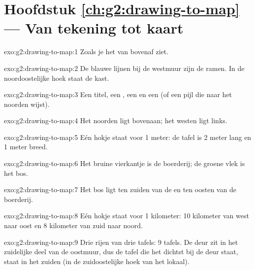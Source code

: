 \section*{Hoofdstuk \ref{ch:g2:drawing-to-map} --- Van tekening tot kaart}

\begin{solution}{exo:g2:drawing-to-map:1}
Zoals je het van bovenaf ziet.
\end{solution}

\begin{solution}{exo:g2:drawing-to-map:2}
De blauwe lijnen bij de westmuur zijn de ramen. In de noordoostelijke hoek
staat de kast.
\end{solution}

\begin{solution}{exo:g2:drawing-to-map:3}
Een titel, een , een  en een  (of een pijl die naar het noorden wijst).
\end{solution}

\begin{solution}{exo:g2:drawing-to-map:4}
Het noorden ligt bovenaan; het westen ligt links.
\end{solution}

\begin{solution}{exo:g2:drawing-to-map:5}
Eén hokje staat voor 1 meter: de tafel is 2 meter lang en 1 meter breed.
\end{solution}

\begin{solution}{exo:g2:drawing-to-map:6}
Het bruine vierkantje is de boerderij; de groene vlek is het bos.
\end{solution}

\begin{solution}{exo:g2:drawing-to-map:7}
Het bos ligt ten zuiden van de  en ten oosten van de boerderij.
\end{solution}

\begin{solution}{exo:g2:drawing-to-map:8}
Eén hokje staat voor 1 kilometer: 10 kilometer van west naar oost en
8 kilometer van zuid naar noord.
\end{solution}

\begin{solution}{exo:g2:drawing-to-map:9}
Drie rijen van drie tafels: 9 tafels. De deur zit in het zuidelijke deel
van de oostmuur, dus de tafel die het dichtst bij de deur staat, staat in
het zuiden (in de zuidoostelijke hoek van het lokaal).
\end{solution}

